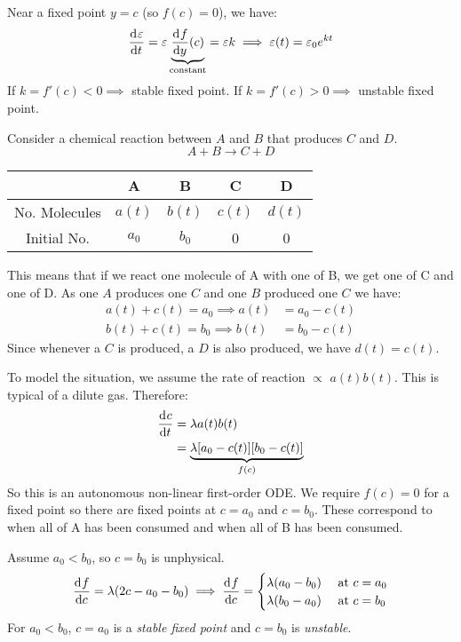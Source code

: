\documentclass[../main.tex]{subfiles}
\begin{document}
Near a fixed point $y = c$ (so $f(c) = 0$), we have:
\[
  \deriv{\varepsilon}{t} = \varepsilon \underbrace{\deriv{f}{y}(c)}_{\text{constant}} = \varepsilon k \implies
  \varepsilon(t) = \varepsilon_0 e^{kt}
\]
If $k = f'(c) < 0 \implies$ stable fixed point.
If $k = f'(c) > 0 \implies$ unstable fixed point.
\begin{example}
  Consider a chemical reaction between $A$ and $B$ that produces $C$ and $D$.
  \[
    A + B \longrightarrow C + D
  \]
  \begin{center}
  \begin{tabular}{c|c|c|c|c}
   & A & B & C & D \\
  \hline
  No. Molecules & $a(t)$ & $b(t)$ & $c(t)$ & $d(t)$ \\
  \hline
  Initial No. & $a_0$ & $b_0$ & 0 & 0
  \end{tabular}
  \end{center}
  This means that if we react one molecule of A with one of B, we get one of C and one of D.
  As one $A$ produces one $C$ and one $B$ produced one $C$ we have:
  \begin{align*}
    a(t) + c(t) = a_0 \implies a(t) &= a_0 - c(t) \\
    b(t) + c(t) = b_0 \implies b(t) &= b_0 - c(t)
  \end{align*}
  Since whenever a $C$ is produced, a $D$ is also produced, we have $d(t) = c(t)$.

  To model the situation, we assume the rate of reaction $\propto$ $a(t)b(t)$.
  This is typical of a dilute gas.
  Therefore:
  \begin{align*}
    \deriv{c}{t} &= \lambda a(t)b(t) \\
                 &= \underbrace{\lambda[a_0 - c(t)][b_0 - c(t)]}_{f(c)}
  \end{align*}
  So this is an autonomous non-linear first-order ODE.
  We require $f(c) = 0$ for a fixed point so there are fixed points at $c = a_0$ and $c = b_0$.
  These correspond to when all of A has been consumed and when all of B has been consumed.

  Assume $a_0 < b_0$, so $c = b_0$ is unphysical.
  \[
    \deriv{f}{c} = \lambda (2c - a_0 -b_0) \implies \deriv{f}{c} = \begin{cases}
    \lambda(a_0 - b_0) & \text{ at }c=a_0 \\
    \lambda(b_0 - a_0) & \text{ at }c=b_0
    \end{cases}
  \]
  For $a_0 < b_0$, $c = a_0$ is a \textit{stable fixed point} and $c = b_0$ is \textit{unstable}.
  \begin{center}
\end{center}
\end{example}
\end{document}
